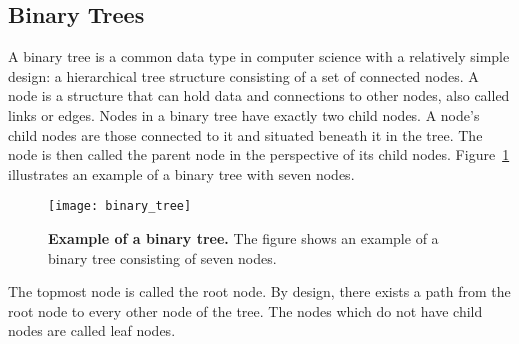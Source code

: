 
%


\subsection{Binary Trees}
A binary tree is a common data type in computer science with a relatively simple design: a hierarchical tree structure consisting of a set of connected nodes. A node is a structure that can hold data and connections to other nodes, also called links or edges. Nodes in a binary tree have exactly two child nodes. A node's child nodes are those connected to it and situated beneath it in the tree. The node is then called the parent node in the perspective of its child nodes. Figure~\ref{fig:binary_tree_illustration} illustrates an example of a binary tree with seven nodes.
\begin{figure}[!ht]
\centering
\texttt{[image: binary\_tree]}
\caption[Example of a binary tree]{
  \textbf{Example of a binary tree.}
  The figure shows an example of a binary tree consisting of seven nodes.
}
\label{fig:binary_tree_illustration}
\end{figure}
The topmost node is called the root node. By design, there exists a path from the root node to every other node of the tree. The nodes which do not have child nodes are called leaf nodes.

